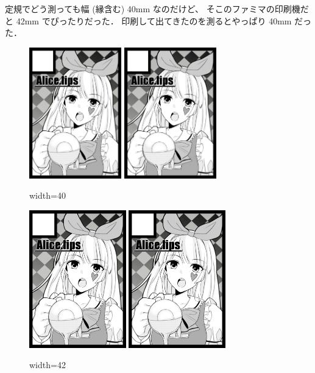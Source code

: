 \documentclass[a4paper]{jarticle}
\begin{document}
定規でどう測っても幅 (縁含む) 40mm なのだけど、
そこのファミマの印刷機だと 42mm でぴったりだった．
印刷して出てきたのを測るとやっぱり 40mm だった．

\begin{figure}
  \includegraphics[width=40mm,bb=0 0 600 853]{origin.png}
  \hfill
  \includegraphics[width=40mm,bb=0 0 600 853]{origin.png}
  \caption{width=40}
\end{figure}

\begin{figure}
  \includegraphics[width=42mm,bb=0 0 600 853]{origin.png}
  \hfill
  \includegraphics[width=42mm,bb=0 0 600 853]{origin.png}
  \caption{width=42}
\end{figure}
\end{document}
